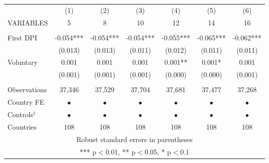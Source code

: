 \begin{tabular}{lcccccc} \hline
 & (1) & (2) & (3) & (4) & (5) & (6) \\
VARIABLES & 5 & 8 & 10 & 12 & 14 & 16 \\ \hline
 &  &  &  &  &  &  \\
First DPI & -0.054*** & -0.054*** & -0.054*** & -0.055*** & -0.065*** & -0.062*** \\
 & (0.013) & (0.013) & (0.011) & (0.012) & (0.011) & (0.011) \\
Voluntary & 0.001 & 0.001 & 0.001 & 0.001** & 0.001* & 0.001 \\
 & (0.001) & (0.001) & (0.001) & (0.000) & (0.000) & (0.001) \\
 &  &  &  &  &  &  \\
Observations & 37,346 & 37,529 & 37,704 & 37,681 & 37,477 & 37,268 \\
Country FE & $ \bullet $ & $ \bullet $ & $ \bullet $ & $ \bullet $ & $ \bullet $ & $ \bullet $ \\
Controls$^\ddag$ & $ \bullet $ & $ \bullet $ & $ \bullet $ & $ \bullet $ & $ \bullet $ & $ \bullet $ \\
 Countries & 108 & 108 & 108 & 108 & 108 & 108 \\ \hline
\multicolumn{7}{c}{ Robust standard errors in parentheses} \\
\multicolumn{7}{c}{ *** p$<$0.01, ** p$<$0.05, * p$<$0.1} \\
\end{tabular}

